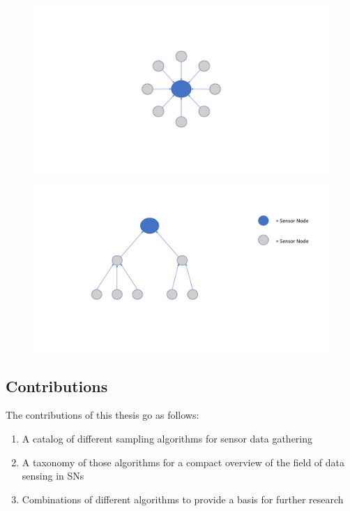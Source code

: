 \begin{figure}
\centering
\begin{minipage}{.5\textwidth}
  \centering
  \includegraphics[width=\linewidth]{images/star-structure.pdf}
  \label{fig:Star Topology}
\end{minipage}%
\begin{minipage}{.5\textwidth}
  \centering
  \includegraphics[width=\linewidth]{images/tree-structure.pdf}
  \label{fig:Tree Topology}
\end{minipage}
\end{figure}

\FloatBarrier


\subsection{Contributions}
\label{sec:contributions}

The contributions of this thesis go as follows: 
\begin{enumerate}
	\item A catalog of different sampling algorithms for sensor data gathering
	\item A taxonomy of those algorithms for a compact overview of the field of data sensing in \acp{SN}
	\item Combinations of different algorithms to provide a basis for further
	research
\end{enumerate}


